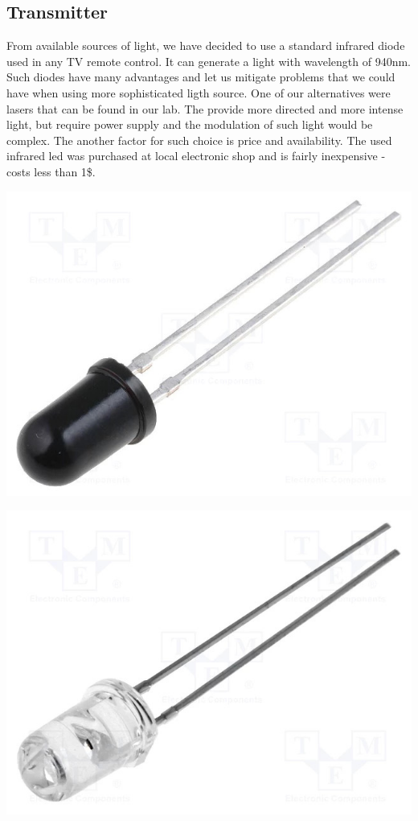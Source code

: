 \documentclass[12pt]{article}
\begin{document}
  \subsection{Transmitter}
  From available sources of light, we have decided to use a standard infrared diode used in any TV remote control. It can generate a light with wavelength of 940nm.
  Such diodes have many advantages and let us mitigate problems that we could have when using more sophisticated ligth source. One of our alternatives were lasers that
  can be found in our lab. The provide more directed and more intense light, but require power supply and the modulation of such light would be complex.
  The another factor for such choice is price and availability. The used infrared led was purchased at local electronic shop and is fairly inexpensive - costs less than 1\$.
  \begin{multicols}{2}
    \centering
    \includegraphics[scale=0.6]{photodiode.jpg}
     \par
    \includegraphics[scale=0.6]{ir_diode.jpg}
  \end{multicols}
  
\end{document}
